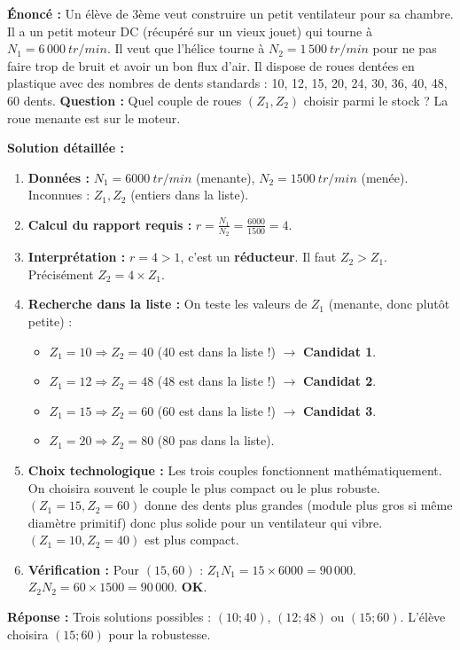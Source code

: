 \documentclass[11pt]{article}
\begin{document}
\begin{exoresolu}
\textbf{Énoncé :} Un élève de 3ème veut construire un petit ventilateur pour sa chambre. Il a un petit moteur DC (récupéré sur un vieux jouet) qui tourne à \textbf{$N_1 = 6\,000\ \si{tr/min}$}. Il veut que l'hélice tourne à \textbf{$N_2 = 1\,500\ \si{tr/min}$} pour ne pas faire trop de bruit et avoir un bon flux d'air. Il dispose de roues dentées en plastique avec des nombres de dents standards : 10, 12, 15, 20, 24, 30, 36, 40, 48, 60 dents.
\textbf{Question :} Quel couple de roues $(Z_1, Z_2)$ choisir parmi le stock ? La roue menante est sur le moteur.

\tcblower
\textbf{Solution détaillée :}
\begin{enumerate}
    \item \textbf{Données :} $N_1 = 6000\ \si{tr/min}$ (menante), $N_2 = 1500\ \si{tr/min}$ (menée). Inconnues : $Z_1, Z_2$ (entiers dans la liste).
    \item \textbf{Calcul du rapport requis :} $r = \frac{N_1}{N_2} = \frac{6000}{1500} = 4$.
    \item \textbf{Interprétation :} $r = 4 > 1$, c'est un \textbf{réducteur}. Il faut $Z_2 > Z_1$. Précisément $Z_2 = 4 \times Z_1$.
    \item \textbf{Recherche dans la liste :} On teste les valeurs de $Z_1$ (menante, donc plutôt petite) :
        \begin{itemize}
            \item $Z_1 = 10 \Rightarrow Z_2 = 40$ (40 est dans la liste !) $\rightarrow$ \textbf{Candidat 1}.
            \item $Z_1 = 12 \Rightarrow Z_2 = 48$ (48 est dans la liste !) $\rightarrow$ \textbf{Candidat 2}.
            \item $Z_1 = 15 \Rightarrow Z_2 = 60$ (60 est dans la liste !) $\rightarrow$ \textbf{Candidat 3}.
            \item $Z_1 = 20 \Rightarrow Z_2 = 80$ (80 pas dans la liste).
        \end{itemize}
    \item \textbf{Choix technologique :} Les trois couples fonctionnent mathématiquement. On choisira souvent le couple le plus compact ou le plus robuste. $(Z_1=15, Z_2=60)$ donne des dents plus grandes (module plus gros si même diamètre primitif) donc plus solide pour un ventilateur qui vibre. $(Z_1=10, Z_2=40)$ est plus compact.
    \item \textbf{Vérification :} Pour $(15, 60)$ : $Z_1 N_1 = 15 \times 6000 = 90\,000$. $Z_2 N_2 = 60 \times 1500 = 90\,000$. \textbf{OK}.
\end{enumerate}
\textbf{Réponse :} Trois solutions possibles : $(10; 40)$, $(12; 48)$ ou $(15; 60)$. L'élève choisira $(15; 60)$ pour la robustesse.
\end{exoresolu}
\end{document}
